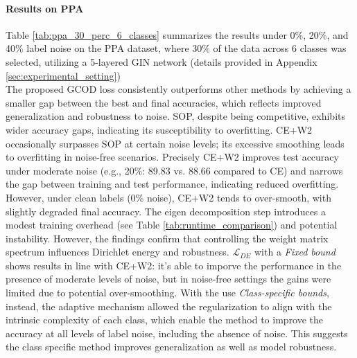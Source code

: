 \paragraph{Results on PPA}
Table \ref{tab:ppa_30_perc_6_classes} summarizes the results under 0\%, 20\%, and 40\% label noise on the PPA dataset, where 30\% of the data across $6$ classes was selected, utilizing a 5-layered GIN network (details provided in Appendix \ref{sec:experimental_setting})  \\
The proposed {GCOD} loss consistently outperforms other methods by achieving a smaller gap between the best and final accuracies, which reflects improved generalization and robustness to noise. 
SOP, despite being competitive, exhibits wider accuracy gaps, indicating its susceptibility to overfitting. 
 {CE+W2} occasionally surpasses SOP at certain noise levels; its excessive smoothing leads to overfitting in noise-free scenarios. 
Precisely {CE+W2} improves test accuracy under moderate noise (e.g., 20\%: 89.83 vs. 88.66 compared to CE) and narrows the gap between training and test performance, indicating reduced overfitting. 
However, under clean labels (0\%  noise), CE+W2 tends to over-smooth, with slightly degraded final accuracy. The eigen decomposition step introduces a modest training overhead (see Table \ref{tab:runtime_comparison}) and potential instability. However, the findings confirm that controlling the weight matrix spectrum influences Dirichlet energy and robustness. $\mathcal L_{DE}$ with a \emph{Fixed bound} shows results in line with CE+W2: it's able to imporve the performance in the presence of moderate levels of noise, but in noise-free settings the gains were limited due to potential over-smoothing. With the use \emph{Class-specific bounds}, instead, the adaptive mechanism allowed the regularization to align with the intrinsic complexity of each class, which enable the method to improve the accuracy at all levels of label noise, including the absence of noise. This suggests the class specific method improves generalization as well as model robustness.

